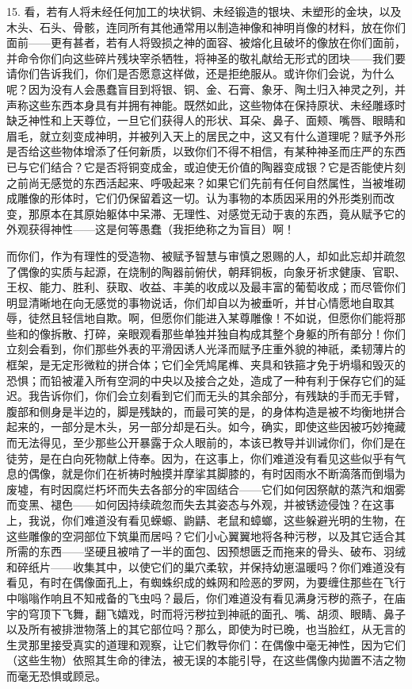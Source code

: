 15. 看，若有人将未经任何加工的块状铜、未经锻造的银块、未塑形的金块，以及木头、石头、骨骸，连同所有其他通常用以制造神像和神明肖像的材料，放在你们面前——更有甚者，若有人将毁损之神的面容、被熔化且破坏的像放在你们面前，并命令你们向这些碎片残块宰杀牺牲，将神圣的敬礼献给无形式的团块——我们要请你们告诉我们，你们是否愿意这样做，还是拒绝服从。或许你们会说，为什么呢？因为没有人会愚蠢盲目到将银、铜、金、石膏、象牙、陶土归入神灵之列，并声称这些东西本身具有并拥有神能。既然如此，这些物体在保持原状、未经雕琢时缺乏神性和上天尊位，一旦它们获得人的形状、耳朵、鼻子、面颊、嘴唇、眼睛和眉毛，就立刻变成神明，并被列入天上的居民之中，这又有什么道理呢？赋予外形是否给这些物体增添了任何新质，以致你们不得不相信，有某种神圣而庄严的东西已与它们结合？它是否将铜变成金，或迫使无价值的陶器变成银？它是否能使片刻之前尚无感觉的东西活起来、呼吸起来？如果它们先前有任何自然属性，当被堆砌成雕像的形体时，它们仍保留着这一切。认为事物的本质因采用的外形类别而改变，那原本在其原始躯体中呆滞、无理性、对感觉无动于衷的东西，竟从赋予它的外观获得神性——这是何等愚蠢（我拒绝称之为盲目）啊！\par

而你们，作为有理性的受造物、被赋予智慧与审慎之恩赐的人，却如此忘却并疏忽了偶像的实质与起源，在烧制的陶器前俯伏，朝拜铜板，向象牙祈求健康、官职、王权、能力、胜利、获取、收益、丰美的收成以及最丰富的葡萄收成；而尽管你们明显清晰地在向无感觉的事物说话，你们却自以为被垂听，并甘心情愿地自取其辱，徒然且轻信地自欺。啊，但愿你们能进入某尊雕像！不如说，但愿你们能将那些和的像拆散、打碎，亲眼观看那些单独并独自构成其整个身躯的所有部分！你们立刻会看到，你们那些外表的平滑因诱人光泽而赋予庄重外貌的神祇，柔韧薄片的框架，是无定形微粒的拼合体；它们全凭鸠尾榫、夹具和铁箍才免于坍塌和毁灭的恐惧；而铅被灌入所有空洞的中央以及接合之处，造成了一种有利于保存它们的延迟。我告诉你们，你们会立刻看到它们而无头的其余部分，有残缺的手而无手臂，腹部和侧身是半边的，脚是残缺的，而最可笑的是，的身体构造是被不均衡地拼合起来的，一部分是木头，另一部分却是石头。如今，确实，即使这些因被巧妙掩藏而无法得见，至少那些公开暴露于众人眼前的，本该已教导并训诫你们，你们是在徒劳，是在白向死物献上侍奉。因为，在这事上，你们难道没有看见这些似乎有气息的偶像，就是你们在祈祷时触摸并摩挲其脚膝的，有时因雨水不断滴落而倒塌为废墟，有时因腐烂朽坏而失去各部分的牢固结合——它们如何因祭献的蒸汽和烟雾而变黑、褪色——如何因持续疏忽而失去其姿态与外观，并被锈迹侵蚀？在这事上，我说，你们难道没有看见蝾螈、鼩鼱、老鼠和蟑螂，这些躲避光明的生物，在这些雕像的空洞部位下筑巢而居吗？它们小心翼翼地将各种污秽，以及其它适合其所需的东西——坚硬且被啃了一半的面包、因预想匮乏而拖来的骨头、破布、羽绒和碎纸片——收集其中，以使它们的巢穴柔软，并保持幼崽温暖吗？你们难道没有看见，有时在偶像面孔上，有蜘蛛织成的蛛网和险恶的罗网，为要缠住那些在飞行中嗡嗡作响且不知戒备的飞虫吗？最后，你们难道没有看见满身污秽的燕子，在庙宇的穹顶下飞舞，翻飞嬉戏，时而将污秽拉到神祇的面孔、嘴、胡须、眼睛、鼻子以及所有被排泄物落上的其它部位吗？那么，即使为时已晚，也当脸红，从无言的生灵那里接受真实的道理和观察，让它们教导你们：在偶像中毫无神性，因为它们（这些生物）依照其生命的律法，被无误的本能引导，在这些偶像内拋置不洁之物而毫无恐惧或顾忌。\par

